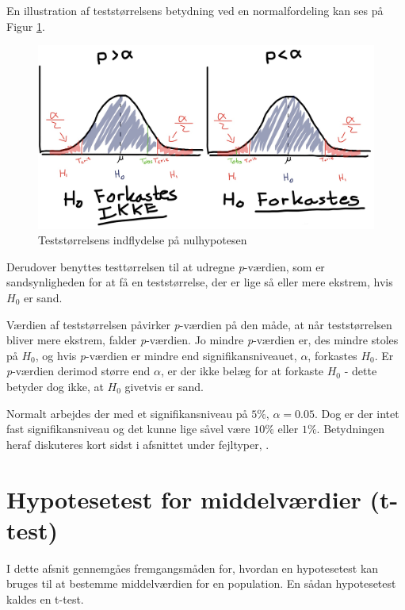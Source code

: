 \documentclass[
]{book}
\theoremstyle{definition}
\theoremstyle{definition}
\theoremstyle{definition}
\theoremstyle{remark}
\begin{document}
En illustration af teststørrelsens betydning ved en normalfordeling kan ses på Figur \ref{fig:figur-Hypotesetest}.

\begin{figure}

{\centering \includegraphics[width=0.75\linewidth]{images/HippoHyppo}

}

\caption{Teststørrelsens indflydelse på nulhypotesen}\label{fig:figur-Hypotesetest}
\end{figure}

Derudover benyttes testtørrelsen til at udregne \emph{p}-værdien, som er sandsynligheden for at få en teststørrelse, der er lige så eller mere ekstrem, hvis \(H_0\) er sand.

Værdien af teststørrelsen påvirker \emph{p}-værdien på den måde, at når teststørrelsen bliver mere ekstrem, falder \emph{p}-værdien. Jo mindre \emph{p}-værdien er, des mindre stoles på \(H_0\), og hvis \emph{p}-værdien er mindre end signifikansniveauet, \(\alpha\), forkastes \(H_0\). Er \emph{p}-værdien derimod større end \(\alpha\), er der ikke belæg for at forkaste \(H_0\) - dette betyder dog ikke, at \(H_0\) givetvis er sand.

Normalt arbejdes der med et signifikansniveau på \(5\%\), \(\alpha=0.05\). Dog er der intet fast signifikansniveau og det kunne lige såvel være \(10\%\) eller \(1\%\). Betydningen heraf diskuteres kort sidst i afsnittet under fejltyper, \citep{ASTA-HYPO}.

\hypertarget{t-test}{%
\section{Hypotesetest for middelværdier (t-test)}\label{t-test}}

I dette afsnit gennemgåes fremgangsmåden for, hvordan en hypotesetest kan bruges til at bestemme middelværdien for en population. En sådan hypotesetest kaldes en t-test.
\end{document}

